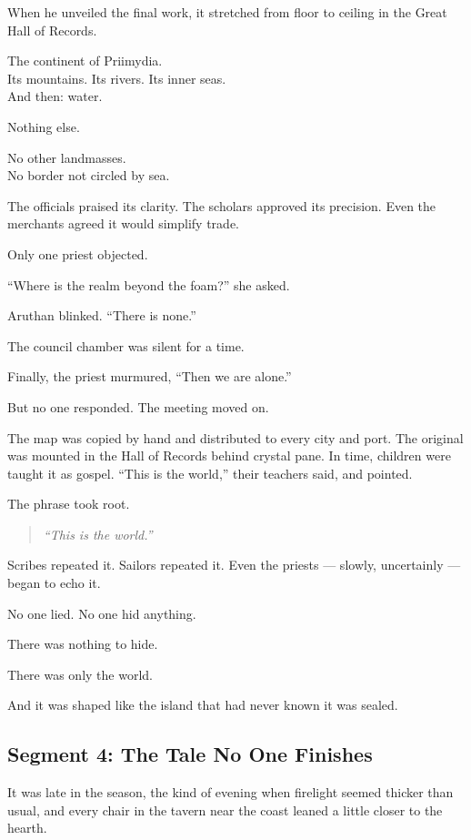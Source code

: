 \documentclass[9pt]{article}
\begin{document}
When he unveiled the final work, it stretched from floor to ceiling in the Great Hall of Records.

The continent of Priimydia.\\
Its mountains. Its rivers. Its inner seas.\\
And then: water.

Nothing else.

No other landmasses.\\
No border not circled by sea.

The officials praised its clarity. The scholars approved its precision. Even the merchants agreed it would simplify trade.

Only one priest objected.

``Where is the realm beyond the foam?'' she asked.

Aruthan blinked. ``There is none.''

The council chamber was silent for a time.

Finally, the priest murmured, ``Then we are alone.''

But no one responded. The meeting moved on.

The map was copied by hand and distributed to every city and port. The original was mounted in the Hall of Records behind crystal pane. In time, children were taught it as gospel. ``This is the world,'' their teachers said, and pointed.

The phrase took root.

\begin{quote}
\emph{``This is the world.''}
\end{quote}

Scribes repeated it. Sailors repeated it. Even the priests — slowly, uncertainly — began to echo it.

No one lied. No one hid anything.

There was nothing to hide.

There was only the world.

And it was shaped like the island that had never known it was sealed.


\newpage

\subsection*{Segment 4: The Tale No One Finishes}

It was late in the season, the kind of evening when firelight seemed thicker than usual, and every chair in the tavern near the coast leaned a little closer to the hearth.
\end{document}
